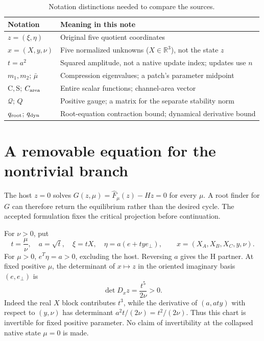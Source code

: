 \documentclass[11pt,a4paper]{article}
\numberwithin{equation}{section}
\newcommand{\R}{\mathbb R}\newcommand{\C}{\mathbb C}
\newcommand{\Fh}{\widehat F}\newcommand{\eps}{\varepsilon}
\newcommand{\entC}{\mathrm C}\newcommand{\entS}{\mathrm S}
\begin{document}
\begin{table}[htbp]\centering\small
\begin{tabular}{P{.23\linewidth}P{.67\linewidth}}\toprule
Notation & Meaning in this note\\\midrule
$z=(\xi,\eta)$ & Original five quotient coordinates\\
$x=(X,y,\nu)$ & Five normalized unknowns ($X\in\R^3$), not the state $z$\\
$t=a^2$ & Squared amplitude, not a native update index; updates use $n$\\
$m_1,m_2$; $\bar\mu$ & Compression eigenvalues; a patch's parameter midpoint\\
$\entC,\entS$; $C_{\rm area}$ & Entire scalar functions; channel-area vector\\
$\mathcal Q$; $Q$ & Positive gauge; a matrix for the separate stability norm\\
$q_{\rm root}$; $q_{\rm dyn}$ & Root-equation contraction bound; dynamical derivative bound\\\bottomrule
\end{tabular}
\caption{Notation distinctions needed to compare the sources.}\label{tab:notation}
\end{table}

\section{A removable equation for the nontrivial branch}\label{sec:removable}
The host $z=0$ solves $G(z,\mu)=\Fh_\mu(z)-Hz=0$ for every $\mu$. A root finder for $G$ can therefore return the equilibrium rather than the desired cycle. The accepted formulation fixes the critical projection before continuation.

For $\nu>0$, put
\begin{equation}
t=\frac\mu\nu,\quad a=\sqrt t,\quad
\xi=tX,\quad\eta=a(e+t y e_\perp),\qquad
x=(X_A,X_B,X_C,y,\nu).\label{eq:normalization}
\end{equation}
For $\mu>0$, $e^T\eta=a>0$, excluding the host. Reversing $a$ gives the H partner. At fixed positive $\mu$, the determinant of $x\mapsto z$ in the oriented imaginary basis $(e,e_\perp)$ is
\begin{equation}
\det D_xz=\frac{t^5}{2\nu}>0.\label{eq:chart-determinant}
\end{equation}
Indeed the real $X$ block contributes $t^3$, while the derivative of $(a,aty)$ with respect to $(y,\nu)$ has determinant $a^2t/(2\nu)=t^2/(2\nu)$. Thus this chart is invertible for fixed positive parameter. No claim of invertibility at the collapsed native state $\mu=0$ is made.
\end{document}

